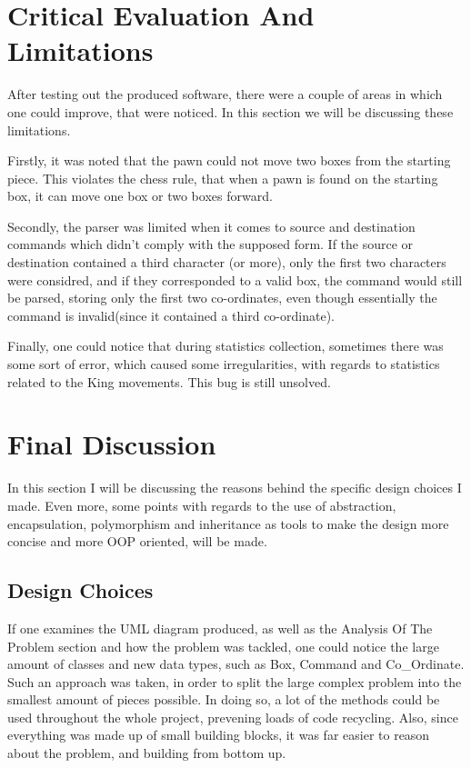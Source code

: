 \documentclass[12pt, A4]{report}
\begin{document}
	\section*{Critical Evaluation And Limitations}
	After testing out the produced software, there were a couple of areas in which one could improve, that were noticed.
	In this section we will be discussing these limitations.

	\par
	Firstly, it was noted that the pawn could not move two boxes from the starting piece. This violates the chess rule, that when a pawn is found on the starting box, it can move one box or two boxes forward.

	\par
	Secondly, the parser was limited when it comes to source and destination commands which didn't comply with the supposed form. If the source or destination contained a third character (or more), only the first two characters were considred, and if they corresponded to a valid box, the command would still be parsed, storing only the first two co-ordinates, even though essentially the command is invalid(since it contained a third co-ordinate).

	\par
	Finally, one could notice that during statistics collection, sometimes there was some sort of error, which caused some irregularities, with regards to statistics related to the King movements. This bug is still unsolved.

	\section*{Final Discussion}
	In this section I will be discussing the reasons behind the specific design choices I made. Even more, some points with regards to the use of abstraction, encapsulation, polymorphism and inheritance as tools to make the design more concise and more OOP oriented, will be made.

		\subsection*{Design Choices}
		If one examines the UML diagram produced, as well as the Analysis Of The Problem section and how the problem was tackled, one could notice the large amount of classes and new data types, such as Box, Command and Co\_Ordinate. Such an approach was taken, in order to split the large complex problem into the smallest amount of pieces possible. In doing so, a lot of the methods could be used throughout the whole project, prevening loads of code recycling. Also, since everything was made up of small building blocks, it was far easier to reason about the problem, and building from bottom up.
\end{document}

